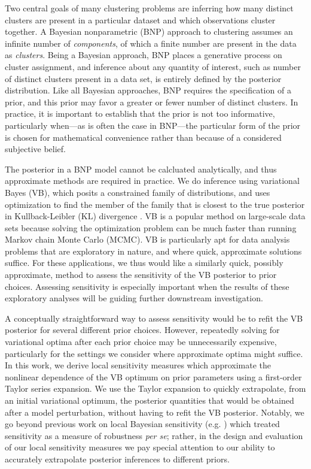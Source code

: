 Two central goals of many clustering problems are inferring how many distinct
clusters are present in a particular dataset and which observations cluster together.
A Bayesian nonparametric (BNP) approach to clustering assumes an infinite
number of \textit{components},
of which a finite number are present in the data as \textit{clusters}.
Being a Bayesian approach, BNP places a generative process
on cluster assignment,
and inference about any quantity of interest,
such as number of distinct clusters present in a data set,
is entirely defined by the posterior distribution.
Like all Bayesian approaches, BNP requires the specification
of a prior, and this prior may favor a greater or fewer number of distinct clusters.
In practice, it is important to establish that the prior is not too informative, particularly
when---as is often the case in BNP---the particular form of the prior is chosen for
mathematical convenience rather than because of a considered subjective belief.

The posterior in a BNP model cannot be calcluated analytically,
and thus approximate methods are required in practice.
We do inference using variational Bayes (VB), which posits a constrained
family of distributions, and uses optimization to find
the member of the family that is closest to the true posterior in
Kullback-Leibler ($\mathrm{KL}$) divergence
\citep{jordan:1999:vi, wainwright:2008:graphical_models, blei:2017:vi_review}.
VB is a popular method on large-scale data sets
because solving the optimization problem can be much faster than
running Markov chain Monte Carlo (MCMC).
VB is particularly apt for data analysis problems that are
exploratory in nature, and where quick, approximate solutions suffice.
For these applications, we thus would like a similarly quick, possibly approximate,
method to assess
the sensitivity of the VB posterior to prior choices.
Assessing sensitivity is especially important
when the results of these exploratory analyses will be guiding further
downstream investigation.

A conceptually straightforward way to assess sensitivity would be to refit the
VB posterior for several different prior choices.
However, repeatedly solving for variational optima after each prior choice
may be unnecessarily expensive, particularly for the settings we consider where
approximate optima might suffice.
In this work, we derive local sensitivity measures which
approximate the nonlinear dependence of the VB optimum on prior parameters
using a first-order Taylor series expansion.
We use the Taylor expansion to quickly extrapolate,
from an initial variational optimum,
the posterior quantities that would be obtained after a model perturbation,
without having to refit the VB posterior.
Notably, we go beyond previous work on local Bayesian sensitivity (e.g. \citet{basu:1996:local})
which treated sensitivity as a measure of robustness \textit{per se};
rather, in the design and evaluation of our local sensitivity
measures we pay special attention to our ability
to accurately extrapolate posterior inferences to different priors.

